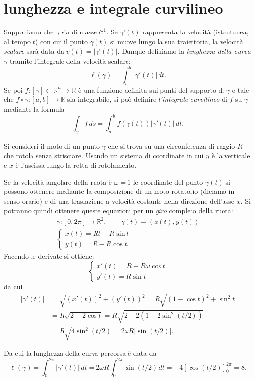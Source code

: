 \documentclass[italian,a4paper,hidelinks]{scrartcl}
\newcommand{\RR}{{\mathbb R}}
\newcommand{\C}{{\mathcal C}}
\newcommand{\defeq}{=}
\begin{document}
\section{lunghezza e integrale curvilineo}
Supponiamo che $\gamma$ sia di classe $\C^1$.
Se $\gamma'(t)$ rappresenta la velocità (istantanea, al tempo $t$) con
cui il punto $\gamma(t)$ si muove lungo la sua traiettoria, la
velocità \emph{scalare} sarà data da $v(t) = \lvert \gamma'(t)
\rvert$.
Dunque definiamo la \emph{lunghezza della curva} $\gamma$ tramite
l'integrale della velocità scalare:
\[
\ell(\gamma) \defeq \int_a^b \lvert \gamma'(t)\rvert \, dt.
\]
Se poi $f\colon [\gamma]\subset \RR^n \to \RR$ è una funzione definita
sui punti del supporto di $\gamma$ e tale che
$f\circ \gamma\colon [a,b]\to \RR$ sia integrabile, si può definire
\emph{l'integrale curvilineo} di $f$ su $\gamma$ mediante la formula
\[
\int_\gamma f\, ds \defeq \int_a^b f(\gamma(t)) \lvert
\gamma'(t)\rvert\, dt.
\]

\begin{example}[la cicloide]
Si consideri il moto di un punto $\gamma$ che si trova su una
circonferenza di raggio $R$ che rotola senza strisciare. Usando un
sistema di coordinate in cui $y$ è la verticale e $x$ è l'ascissa
lungo la retta di rotolamento.

Se la velocità angolare della ruota è $\omega=1$ le coordinate del punto
$\gamma(t)$ si possono ottenere mediante la composizione di un moto
rotatorio (diciamo in senso orario) e di una traslazione a velocità
costante nella direzione dell'asse $x$. Si potranno quindi ottenere
queste equazioni per un \emph{giro} completo della ruota:
\begin{gather*}
\gamma\colon [0,2\pi] \to \RR^2,\qquad \gamma(t)=(x(t), y(t))\\
\begin{cases}
x(t) = R t - R \sin t \\
y(t) = R - R \cos t.
\end{cases}
\end{gather*}
Facendo le derivate si ottiene:
\[
\begin{cases}
x'(t) = R - R \omega \cos t \\
y'(t) = R \sin t
\end{cases}
\]
da cui
\begin{align*}
 \lvert\gamma'(t)\rvert & = \sqrt{(x'(t))^2 + (y'(t))^2}
 =  R \sqrt{ (1-\cos t)^2 + \sin^2 t} \\
 & =  R \sqrt{2 - 2 \cos t}
 =  R \sqrt{2 - 2 (1 - 2\sin^2 (t/2))} \\
 & =  R \sqrt{4 \sin^2(t/2)} = 2\omega R \lvert \sin(t/2)\rvert.
\end{align*}

Da cui la lunghezza della curva percorsa è data da
\[
\ell(\gamma) = \int_0^{2\pi} \lvert \gamma'(t)\rvert \, dt
 = 2 \omega R \int_0^{2\pi} \sin(t/2)\, dt = -4 [ \cos(t/2)]_0^{2\pi}
 = 8.
\]
\end{example}
\end{document}
